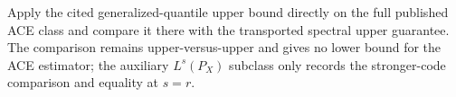 Apply the cited generalized-quantile upper bound directly on the full published ACE class and compare it there with the transported spectral upper guarantee.  The comparison remains upper-versus-upper and gives no lower bound for the ACE estimator; the auxiliary \(L^s(P_X)\) subclass only records the stronger-code comparison and equality at \(s=r\).